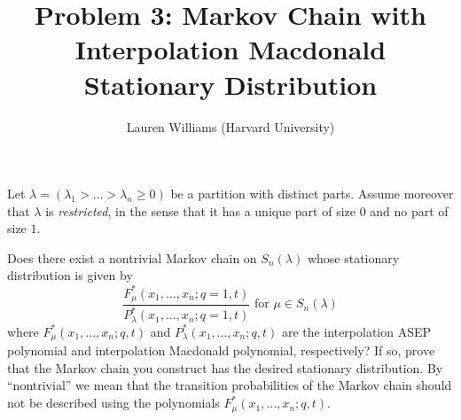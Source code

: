 

\title{Problem 3: Markov Chain with Interpolation Macdonald Stationary Distribution}
\author{Lauren Williams (Harvard University)}
\date{}


\maketitle

Let $\lambda=(\lambda_1 > \dots > \lambda_n \geq 0)$ be a partition with distinct parts.  Assume moreover that $\lambda$ is {\it restricted}, in the sense that it has a unique part of size $0$ and no part of size $1$.

Does there exist a nontrivial Markov chain on $S_n(\lambda)$ whose stationary distribution is given by
$$\frac{F^*_{\mu}(x_1,\dots,x_n; q=1,t)}{P^*_{\lambda}(x_1,\dots,x_n; q=1,t)} \text{ for }\mu\in S_n(\lambda)$$
where $F^*_{\mu}(x_1,\dots,x_n; q,t)$ and $P^*_{\lambda}(x_1,\dots,x_n;q,t)$ are the interpolation ASEP polynomial and interpolation Macdonald polynomial, respectively?  If so, prove that the Markov chain you construct has the desired stationary distribution.  By ``nontrivial'' we mean that the transition probabilities of the Markov chain should not be described using the polynomials $F_{\mu}^*(x_1,\dots,x_n; q,t)$.


